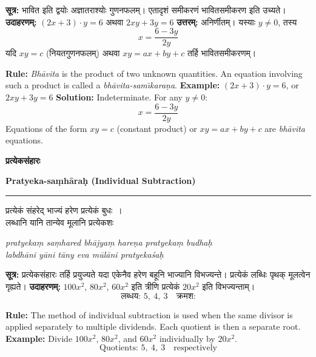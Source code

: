 \documentclass[11pt,a4paper]{article}
\newcommand{\dev}[1]{{\devanagarifont #1}}
\newcommand{\bicol}[2]{%
\noindent%
\begin{minipage}[t]{0.48\textwidth}
\begin{flushleft}
\small
#1
\end{flushleft}
\end{minipage}%
\hfill%
\begin{minipage}[t]{0.48\textwidth}
\begin{flushleft}
\small
#2
\end{flushleft}
\end{minipage}%
\vspace{0.4em}
}
\newcommand{\bicolverse}[2]{%
\par\noindent%
\begin{minipage}[t]{0.48\textwidth}
\centering
\color{versecolor}
\devanagarifont
\small
#1
\end{minipage}%
\hfill%
\begin{minipage}[t]{0.48\textwidth}
\centering
\color{versecolor}
\small
#2
\end{minipage}%
\par\vspace{0.4em}
}
\newcommand{\sectionbicol}[2]{%
\vspace{0.5em}
\noindent%
\begin{minipage}[t]{0.48\textwidth}
\begin{center}
\large\bfseries\color{sectioncolor}
\dev{#1}
\end{center}
\end{minipage}%
\hfill%
\begin{minipage}[t]{0.48\textwidth}
\begin{center}
\large\bfseries\color{sectioncolor}
#2
\end{center}
\end{minipage}%
\vspace{0.3em}
\noindent\rule{\textwidth}{0.4pt}
}
\begin{document}
\bicol{%
\textbf{सूत्र:} \dev{भावित} इति द्वयोः अज्ञातराश्योः गुणनफलम्। एतादृशं समीकरणं \dev{भावितसमीकरण} इति उच्यते।
\vspace{0.3cm}
\textbf{उदाहरणम्:} $(2x + 3) \cdot y = 6$ अथवा $2xy + 3y = 6$
\vspace{0.2cm}
\textbf{उत्तरम्:} अनिर्णीतम्। यस्याः $y \neq 0$, तस्य
\[x = \frac{6 - 3y}{2y}\]
\vspace{0.2cm}
यदि $xy = c$ (नियतगुणनफलम्) अथवा $xy = ax + by + c$ तर्हि भावितसमीकरणम्।
}{%
\textbf{Rule:} \textit{Bh\={a}vita} is the product of two unknown quantities. An equation involving such a product is called a \textit{bh\={a}vita-sam\={\i}kara\d{n}a}.
\vspace{0.3cm}
\textbf{Example:} $(2x + 3) \cdot y = 6$, or $2xy + 3y = 6$
\vspace{0.2cm}
\textbf{Solution:} Indeterminate. For any $y \neq 0$:
\[x = \frac{6 - 3y}{2y}\]
\vspace{0.2cm}
Equations of the form $xy = c$ (constant product) or $xy = ax + by + c$ are \textit{bh\={a}vita} equations.
}

\clearpage

\sectionbicol{प्रत्येकसंहारः}{Pratyeka-sa\d{m}h\={a}ra\d{h} (Individual Subtraction)}

\vspace{0.3cm}

\bicolverse{%
प्रत्येकं संहरेद् भाज्यं हरेण प्रत्येकं बुधः~।\\
लब्धानि यानि तान्येव मूलानि प्रत्येकशः~
}{%
\textit{pratyeka\d{m} sa\d{m}hared bh\={a}jya\d{m} hare\d{n}a pratyeka\d{m} budha\d{h}}\\
\textit{labdh\={a}ni y\={a}ni t\={a}ny eva m\={u}l\={a}ni pratyeka\'{s}a\d{h}}
}

\vspace{0.5cm}

\bicol{%
\textbf{सूत्र:} प्रत्येकसंहारः तर्हि प्रयुज्यते यदा एकेनैव हरेण बहूनि भाज्यानि विभज्यन्ते। प्रत्येकं लब्धिः पृथक् मूलत्वेन गृह्यते।
\vspace{0.3cm}
\textbf{उदाहरणम्:} $100x^2$, $80x^2$, $60x^2$ इति त्रीणि प्रत्येकं $20x^2$ इति विभज्यन्ताम्।
\[\text{लब्धय: } 5,\ 4,\ 3 \quad \text{क्रमश:}\]
}{%
\textbf{Rule:} The method of individual subtraction is used when the same divisor is applied separately to multiple dividends. Each quotient is then a separate root.
\vspace{0.3cm}
\textbf{Example:} Divide $100x^2$, $80x^2$, and $60x^2$ individually by $20x^2$.
\[\text{Quotients: } 5,\ 4,\ 3 \quad \text{respectively}\]
}
\end{document}
